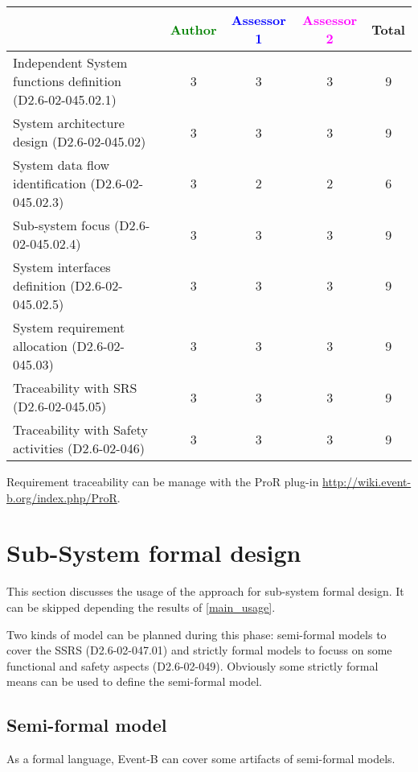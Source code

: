 \begin{tabular}{|l | c | c | c | c|}
\hline
& \textcolor{green}{Author} & \textcolor{blue}{Assessor 1} & \textcolor{magenta}{Assessor 2} & Total \\
\hline
Independent System functions definition (D2.6-02-045.02.1)  & 3 & 3 & 3 & 9 \\
\hline 
System architecture design (D2.6-02-045.02) & 3 & 3 & 3 & 9 \\
\hline
System data flow identification (D2.6-02-045.02.3)  & 3 & 2 & 2 &  6 \\
\hline
Sub-system focus (D2.6-02-045.02.4)  & 3 & 3 & 3 & 9 \\
\hline
System interfaces definition (D2.6-02-045.02.5)  & 3 & 3 & 3 & 9  \\
\hline
System requirement allocation (D2.6-02-045.03)  & 3 & 3 & 3 & 9 \\
\hline
Traceability with SRS (D2.6-02-045.05)  & 3 & 3 & 3 & 9 \\
\hline
Traceability with Safety activities (D2.6-02-046)  & 3 & 3 & 3 & 9 \\
\hline
\end{tabular}

\begin{author_comment}
Requirement traceability can be manage with the ProR plug-in \url{http://wiki.event-b.org/index.php/ProR}.
\end{author_comment}

\section{Sub-System formal design}
This section discusses the usage of the approach for sub-system formal design.
It can be skipped depending the results of \ref{main_usage}.

Two kinds of model can be planned during this phase: semi-formal models to  cover the SSRS (D2.6-02-047.01) and strictly formal  models to  focuss on some functional and safety aspects (D2.6-02-049).  Obviously some strictly  formal means can be used to define the semi-formal  model.

\subsection{Semi-formal model}


\begin{author_comment}
As a formal language, Event-B  can cover some artifacts of semi-formal models.
\end{author_comment}

